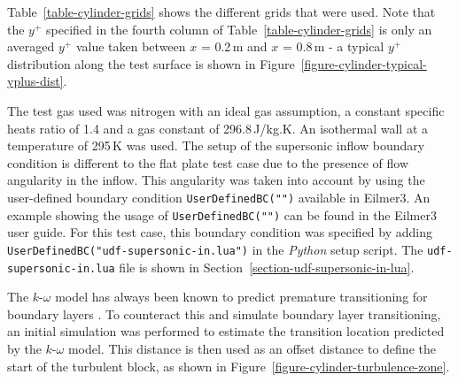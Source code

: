 Table~\ref{table-cylinder-grids} shows the different grids that were used.
Note that the $y^+$ specified in the fourth column of Table~\ref{table-cylinder-grids}
is only an averaged $y^+$ value taken between $x$ = 0.2\,m and $x$ = 0.8\,m
- a typical $y^+$ distribution along the test surface is shown in 
Figure~\ref{figure-cylinder-typical-yplus-dist}.

The test gas used was nitrogen with an ideal gas assumption, a 
constant specific heats ratio of 1.4 and a gas constant of 296.8\,J/kg.K. 
An isothermal wall at a temperature of 295\,K was used. 
The setup of the supersonic inflow boundary condition is different
to the flat plate test case due to the presence of flow angularity
in the inflow. This angularity was taken into account by using the 
user-defined boundary condition \texttt{UserDefinedBC("")} 
available in Eilmer3. An example showing the usage of \texttt{UserDefinedBC("")}
can be found in the Eilmer3 user guide. For this test case,
this boundary condition was specified by adding  \texttt{UserDefinedBC("udf-supersonic-in.lua")} 
in the \textit{Python} setup script. The \texttt{udf-supersonic-in.lua} file 
is shown in Section~\ref{section-udf-supersonic-in-lua}.

The $k$-$\omega$ model has always been known to predict premature
transitioning for boundary layers \cite{Wilcox2006}. To counteract this 
and simulate boundary layer transitioning, an initial simulation was
performed to estimate the transition location predicted by the 
$k$-$\omega$ model. This distance is then used as an offset distance 
to define the start of the turbulent block, as shown in 
Figure~\ref{figure-cylinder-turbulence-zone}.


%

